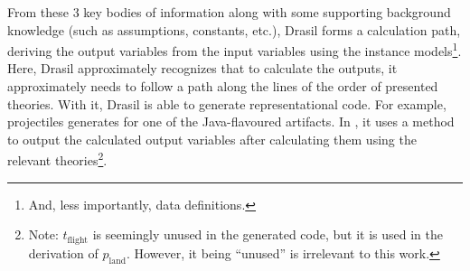 From these 3 key bodies of information along with some supporting background
knowledge (such as assumptions, constants, etc.), Drasil forms a calculation
path, deriving the output variables from the input variables using the instance
models\footnote{And, less importantly, data definitions.}. Here, Drasil
approximately recognizes that to calculate the outputs, it approximately needs
to follow a path along the lines of the order of presented theories. With it,
Drasil is able to generate representational code. For example, \acsp{projectile}
generates  for one of the Java-flavoured
artifacts. In , it uses a
 method to output the calculated output variables
after calculating them using the relevant theories\footnote{Note:
\(t_\text{flight}\) is seemingly unused in the generated code, but it is used in
the derivation of \(p_\text{land}\). However, it being ``unused'' is irrelevant
to this work.}.

\originalJavaProjectileMain{}
